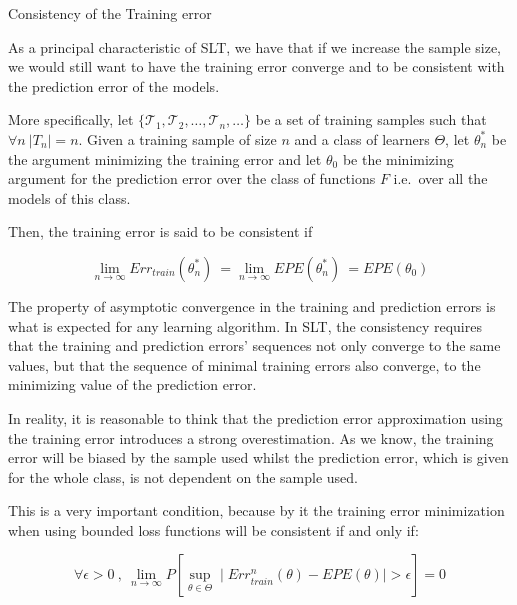 \begin{definition}{Consistency of the Training error}

As a principal characteristic of SLT, we have that if we increase the sample size, we would still want to have the training error converge and to be consistent with the prediction error of the models.

More specifically, let $\{\mathcal {T}_1, \mathcal {T}_2, \ldots, \mathcal {T}_n, \ldots \}$ be a set of training samples such that $\forall n \ |T_n|=n$.
Given a training sample of size $n$ and a class of learners $\Theta$, let $\theta^{*}_n$ be the argument minimizing the training error and let $\theta_0$ be the minimizing argument for the prediction error over the class of functions $F$ i.e.\ over all the models of this class.

Then, the training error is said to be consistent if

\begin{equation}
\lim_{n\to\infty} Err_{train}(\theta^{*}_n) \ = \lim_{n\to\infty} EPE(\theta^{*}_n) \ = EPE(\theta_0)
\end{equation}

\end{definition}

The property of asymptotic convergence in the training and prediction errors is what is expected for any learning algorithm.
In SLT, the consistency requires that the training and prediction errors' sequences not only converge to the same values, but that the sequence of minimal training errors also converge, to the minimizing value of the prediction error.

In reality, it is reasonable to think that the  prediction error approximation using the training error introduces a strong overestimation.
As we know, the training error will be biased by the sample used whilst the prediction error, which is given for the whole class, is not dependent on the sample used.

This is a very important condition, because by it the training error minimization when using bounded loss functions will be consistent if and only if:


\begin{equation}
\forall \epsilon > 0 \ , \ \lim_{n\to\infty} P\left[ \sup_{\theta \in \Theta} \mid Err^{n}_{train}(\theta) - EPE(\theta) \mid  > \epsilon  \right] = 0
\end{equation}

